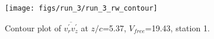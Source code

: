 \begin{figure}[H]
\centering
\texttt{[image: figs/run\_3/run\_3\_rw\_contour]}
\caption{Contour plot of $\overline{v_{r}^{\prime} v_{z}^{\prime}}$ at $z/c$=5.37, $V_{free}$=19.43, station 1.}
\label{fig:run_3_rw_contour}
\end{figure}


